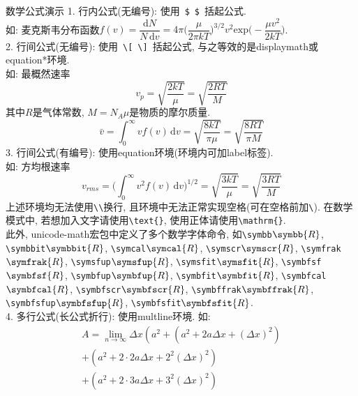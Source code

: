 \documentclass[hyperref,UTF8,11pt,CJK]{beamer}
\begin{document}
\begin{frame}{数学公式演示}
	{\color{JXred}1. 行内公式(无编号):} 使用~\verb|$|~\verb|$|~括起公式.\\
	如: 麦克斯韦分布函数$f(v) = \dfrac{\mathrm{d}N}{N\,\mathrm{d}v} = 4\pi \Big(\dfrac{\mu}{2\pi kT}\Big)^{3/2} v^2 \mathrm{exp}\Big(-\dfrac{\mu v^2}{2kT}\Big)$.\\[1ex]
	{\color{JXred}2. 行间公式(无编号):} 使用~\verb|\[|~\verb|\]|~括起公式, 与之等效的是displaymath或equation*环境.\\
	如: 最概然速率\[v_p = \sqrt{\dfrac{2kT}{\mu}} = \sqrt{\dfrac{2RT}{M}}\]其中$R$是气体常数, $M = N_A \mu$是物质的摩尔质量.\\[1ex]
		\begin{equation*}
			\bar{v} = \int_0^\infty vf(v)\,\mathrm{d}v = \sqrt{\dfrac{8kT}{\pi\mu}} = \sqrt{\dfrac{8RT}{\pi M}}
		\end{equation*}
	{\color{JXred}3. 行间公式(有编号):} 使用equation环境(环境内可加label标签).\\[1ex]
	如: 方均根速率
		\begin{equation}
		v_{rms} = \Big(\int_0^\infty v^2f(v)\,\mathrm{d}v\Big)^{1/2} = \sqrt{\dfrac{3kT}{\mu}} = \sqrt{\dfrac{3RT}{M}}
		\end{equation}
	上述环境均无法使用\verb!\\!换行, 且环境中无法正常实现空格(可在空格前加\verb|\|). 在数学模式中, 若想加入文字请使用\verb|\text|\verb|{}|, 使用正体请使用\verb|\mathrm|\verb|{}|.\\
	此外, unicode-math宏包中定义了多个数学字体命令, 如\verb|\symbb|$\symbb{R}$, \verb|\symbbit|$\symbbit{R}$, \verb|\symcal|$\symcal{R}$, \verb|\symscr|$\symscr{R}$, \verb|\symfrak|$\symfrak{R}$, \verb|\symsfup|$\symsfup{R}$, \verb|\symsfit|$\symsfit{R}$, \verb|\symbfsf|$\symbfsf{R}$, \verb|\symbfup|$\symbfup{R}$, \verb|\symbfit|$\symbfit{R}$, \verb|\symbfcal|$\symbfcal{R}$, \verb|\symbfscr|$\symbfscr{R}$, \verb|\symbffrak|$\symbffrak{R}$, \verb|\symbfsfup|$\symbfsfup{R}$, \verb|\symbfsfit|$\symbfsfit{R}$.\\[1ex]
	{\color{JXred}4. 多行公式(长公式折行):} 使用multline环境.
	如: 
		\begin{multline}
			A=\lim_{n\rightarrow\infty}\Delta x\left(a^{2}+\left(a^{2}+2a\Delta x+\left(\Delta x\right)^{2}\right)\right.\label{eq:reset}\\
			+\left(a^{2}+2\cdot2a\Delta x+2^{2}\left(\Delta x\right)^{2}\right)\\
			+\left(a^{2}+2\cdot3a\Delta x+3^{2}\left(\Delta x\right)^{2}\right)\\

\end{multline}
\end{frame}
\end{document}
